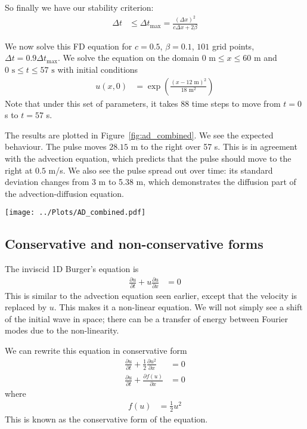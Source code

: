 \documentclass[twocolumn]{myarticle}
\begin{document}
So finally we have our stability criterion:
\begin{align}
    \Delta t &\leq \Delta t_\text{max} = \frac{(\Delta x)^2}{c \Delta x + 2 \beta} \label{eq:lax_wendroff_stability}
\end{align}

We now solve this FD equation for $ c = 0.5 $, $ \beta = 0.1 $, $ 101 $ grid points, $ \Delta t = 0.9 \Delta t_\text{max} $.
We solve the equation on the domain $ 0 \text{ m} \leq x \leq 60 \text{ m} $ and $ 0 \text{ s} \leq t \leq 57 \text{ s} $ with initial conditions
\begin{align}
    u(x, 0) &= \exp \left( \frac{(x - 12 \text{ m})^2}{18 \text{ m}^2} \right)
\end{align}
Note that under this set of parameters, it takes 88 time steps to move from $ t = 0 $ s to $ t = 57 $ s.

The results are plotted in Figure~\ref{fig:ad_combined}.
We see the expected behaviour.
The pulse moves $ 28.15 $ m to the right over 57 s.
This is in agreement with the advection equation, which predicts that the pulse should move to the right at $ 0.5 $ m/s.
We also see the pulse spread out over time: its standard deviation changes from 3 m to 5.38 m, which demonstrates the diffusion part of the advection-diffusion equation.

\begin{figure*}[ht]
    \centering
    \texttt{[image: ../Plots/AD\_combined.pdf]}
    \caption{Solution to the combined advection-diffusion equation.}
    \label{fig:ad_combined}
\end{figure*}

\subsection{Conservative and non-conservative forms}
\label{subsec:conservative_and_non_conservative_forms}

The inviscid 1D Burger's equation is
\begin{align}
    \frac{\partial u}{\partial t} + u \frac{\partial u}{\partial x} &= 0
\end{align}
This is similar to the advection equation seen earlier, except that the velocity is replaced by $ u $.
This makes it a non-linear equation.
We will not simply see a shift of the initial wave in space; there can be a transfer of energy between Fourier modes due to the non-linearity.

We can rewrite this equation in conservative form
\begin{align}
    \frac{\partial u}{\partial t} + \frac{1}{2} \frac{\partial u^2}{\partial x} &= 0
    \\
    \frac{\partial u}{\partial t} + \frac{\partial f(u)}{\partial x} &= 0
\end{align}
where
\begin{align}
    f(u) &= \frac{1}{2} u^2
\end{align}
This is known as the conservative form of the equation.
\end{document}

